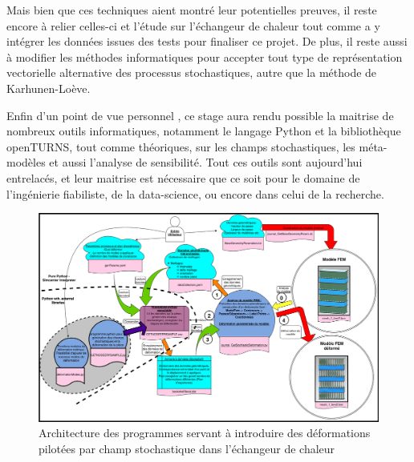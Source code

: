\documentclass[a4paper,10pt]{article}
\begin{document}
Mais bien que ces techniques aient montré leur potentielles preuves, il reste encore à relier celles-ci et l'étude sur l'échangeur de chaleur tout comme a y intégrer les données issues des tests pour finaliser ce projet. De plus, il reste aussi à modifier les méthodes informatiques pour accepter tout type de représentation vectorielle alternative des processus stochastiques, autre que la méthode de Karhunen-Loève. \par \bigskip

Enfin d'un point de vue personnel , ce stage aura rendu possible la maitrise de nombreux outils informatiques, notamment le langage Python et la bibliothèque openTURNS, tout comme théoriques, sur les champs stochastiques, les méta-modèles et aussi l'analyse de sensibilité. Tout ces outils sont aujourd'hui entrelacés, et leur maitrise est nécessaire que ce soit pour le domaine de l'ingénierie fiabiliste, de la data-science, ou encore dans celui de la recherche. 

\newpage 



\appendix 
\appendixpage

\begin{figure}[H]
   \centering
   \vspace{-2cm}
   \includegraphics[angle=-90,origin=c,width=1.1\textwidth,height=1.1\textheight,keepaspectratio]{SchemaDeformationNastran.jpg}
      \caption{Architecture des programmes servant à introduire des déformations pilotées par champ stochastique dans l'échangeur de chaleur}
         \label{SchemaDeformationNastran}
\end{figure}
\end{document}
